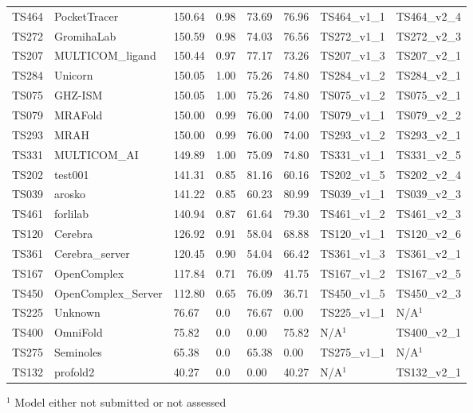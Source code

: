 \begin{table}[ht]
{\begin{tabular}{llllllll}
TS464 & PocketTracer & 150.64 & 0.98 & 73.69 & 76.96 & TS464\_v1\_1 & TS464\_v2\_4 \\ 
TS272 & GromihaLab & 150.59 & 0.98 & 74.03 & 76.56 & TS272\_v1\_1 & TS272\_v2\_3 \\ 
TS207 & MULTICOM\_ligand & 150.44 & 0.97 & 77.17 & 73.26 & TS207\_v1\_3 & TS207\_v2\_1 \\ 
TS284 & Unicorn & 150.05 & 1.00 & 75.26 & 74.80 & TS284\_v1\_2 & TS284\_v2\_1 \\ 
TS075 & GHZ-ISM & 150.05 & 1.00 & 75.26 & 74.80 & TS075\_v1\_2 & TS075\_v2\_1 \\ 
TS079 & MRAFold & 150.00 & 0.99 & 76.00 & 74.00 & TS079\_v1\_1 & TS079\_v2\_2 \\ 
TS293 & MRAH & 150.00 & 0.99 & 76.00 & 74.00 & TS293\_v1\_2 & TS293\_v2\_1 \\ 
TS331 & MULTICOM\_AI & 149.89 & 1.00 & 75.09 & 74.80 & TS331\_v1\_1 & TS331\_v2\_5 \\ 
TS202 & test001 & 141.31 & 0.85 & 81.16 & 60.16 & TS202\_v1\_5 & TS202\_v2\_4 \\ 
TS039 & arosko & 141.22 & 0.85 & 60.23 & 80.99 & TS039\_v1\_1 & TS039\_v2\_3 \\ 
TS461 & forlilab & 140.94 & 0.87 & 61.64 & 79.30 & TS461\_v1\_2 & TS461\_v2\_3 \\ 
TS120 & Cerebra & 126.92 & 0.91 & 58.04 & 68.88 & TS120\_v1\_1 & TS120\_v2\_6 \\ 
TS361 & Cerebra\_server & 120.45 & 0.90 & 54.04 & 66.42 & TS361\_v1\_3 & TS361\_v2\_1 \\ 
TS167 & OpenComplex & 117.84 & 0.71 & 76.09 & 41.75 & TS167\_v1\_2 & TS167\_v2\_5 \\ 
TS450 & OpenComplex\_Server & 112.80 & 0.65 & 76.09 & 36.71 & TS450\_v1\_5 & TS450\_v2\_3 \\ 
TS225 & Unknown & 76.67 & 0.0 & 76.67 & 0.00 & TS225\_v1\_1 & N/A$^{1}$ \\ 
TS400 & OmniFold & 75.82 & 0.0 & 0.00 & 75.82 & N/A$^{1}$ & TS400\_v2\_1 \\ 
TS275 & Seminoles & 65.38 & 0.0 & 65.38 & 0.00 & TS275\_v1\_1 & N/A$^{1}$ \\ 
TS132 & profold2 & 40.27 & 0.0 & 0.00 & 40.27 & N/A$^{1}$ & TS132\_v2\_1 \\ 
\bottomrule
\end{tabular}%
}
\begin{flushleft}\footnotesize $^{1}$ Model either not submitted or not assessed\end{flushleft}
\end{table}
